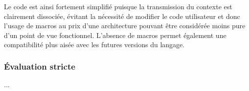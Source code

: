 Le code est ainsi fortement simplifié puisque la transmission du contexte est clairement dissociée, évitant la nécessité de modifier le code utilisateur et donc l'usage de macros au prix d'une architecture pouvant être considérée moins pure d'un point de vue fonctionnel. L'absence de macros permet également une compatibilité plus aisée avec les futures versions du langage.

\subsubsection{Évaluation stricte}

...